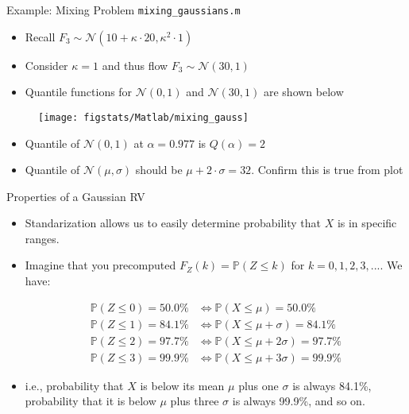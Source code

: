 \documentclass[handout,9pt]{beamer}
\begin{document}
\begin{frame}{Example: Mixing Problem \footnotesize{\texttt{mixing\_gaussians.m}}}
\begin{itemize}
\setlength{\itemsep}{10pt}
\item Recall $F_3\sim\mathcal{N}(10+\kappa\cdot 20,\kappa^2\cdot 1)$
\item Consider $\kappa=1$ and thus flow $F_3\sim\mathcal{N}(30,1)$
\item Quantile functions for  $\mathcal{N}(0,1)$ and $\mathcal{N}(30,1)$ are shown below
\end{itemize}
\begin{figure}[!htb]
    \centering
	\texttt{[image: figstats/Matlab/mixing\_gauss]}
\end{figure}
\begin{itemize}
\item Quantile of $\mathcal{N}(0,1)$ at $\alpha=0.977$ is  $Q(\alpha)=2$
\item Quantile of  $\mathcal{N}(\mu,\sigma)$ should be $\mu+2\cdot \sigma=32$.  Confirm this is true from plot
\end{itemize}
\end{frame}

%
\begin{frame}{Properties of a Gaussian RV}

\begin{itemize}
\setlength{\itemsep}{10pt}

\item Standarization allows us to easily determine probability that $X$ is in specific ranges.

\item Imagine that you precomputed $F_Z(k)=\mathbb{P}(Z\leq k)$ for $k=0,1,2,3,...$. We have:
\begin{block}{}
\begin{align*}
\mathbb{P}(Z\leq 0)=50.0\%&\Longleftrightarrow\mathbb{P}(X\leq \mu)=50.0\%\\
\mathbb{P}(Z\leq 1)=84.1\%&\Longleftrightarrow\mathbb{P}(X\leq \mu+\sigma)=84.1\%\\
\mathbb{P}(Z\leq 2)=97.7\%&\Longleftrightarrow\mathbb{P}(X\leq \mu+2\sigma)=97.7\%\\
\mathbb{P}(Z\leq 3)=99.9\%&\Longleftrightarrow\mathbb{P}(X\leq \mu+3\sigma)=99.9\%
\end{align*}
\end{block}
\item i.e., probability that $X$ is below its mean $\mu$ plus one $\sigma$ is always 84.1\%, probability that it is below $\mu$ plus three $\sigma$ is always 99.9\%, and so on.  
\end{itemize} 

\end{frame}
\end{document}
